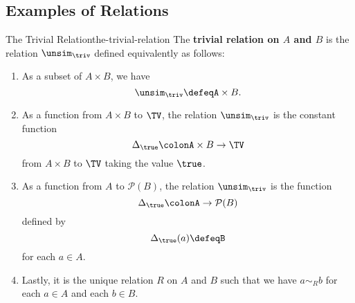 \subsection{Examples of Relations}\label{subsection-examples-of-relations}
\begin{example}{The Trivial Relation}{the-trivial-relation}%
    The \textbf{trivial relation on $A$ and $B$} is the relation $\unsim_{\triv}$ defined equivalently as follows:
    \begin{enumerate}
        \item As a subset of $A\times B$, we have
            \[
                \unsim_{\triv}%
                \defeq%
                A\times B.%
            \]%
        \item As a function from $A\times B$ to $\TV$, the relation $\unsim_{\triv}$ is the constant function
            \[%
                \Delta_{\true}%
                \colon%
                A\times B%
                \to%
                \TV%
            \]%
            from $A\times B$ to $\TV$ taking the value $\true$.
        \item As a function from $A$ to $\mathcal{P}(B)$, the relation $\unsim_{\triv}$ is the function
            \[%
                \Delta_{\true}%
                \colon%
                A%
                \to%
                \mathcal{P}(B)%
            \]%
            defined by
            \[
                \Delta_{\true}(a)%
                \defeq%
                B%
            \]%
            for each $a\in A$.
        \item Lastly, it is the unique relation $R$ on $A$ and $B$ such that we have $a\sim_{R}b$ for each $a\in A$ and each $b\in B$.
    \end{enumerate}
\end{example}
